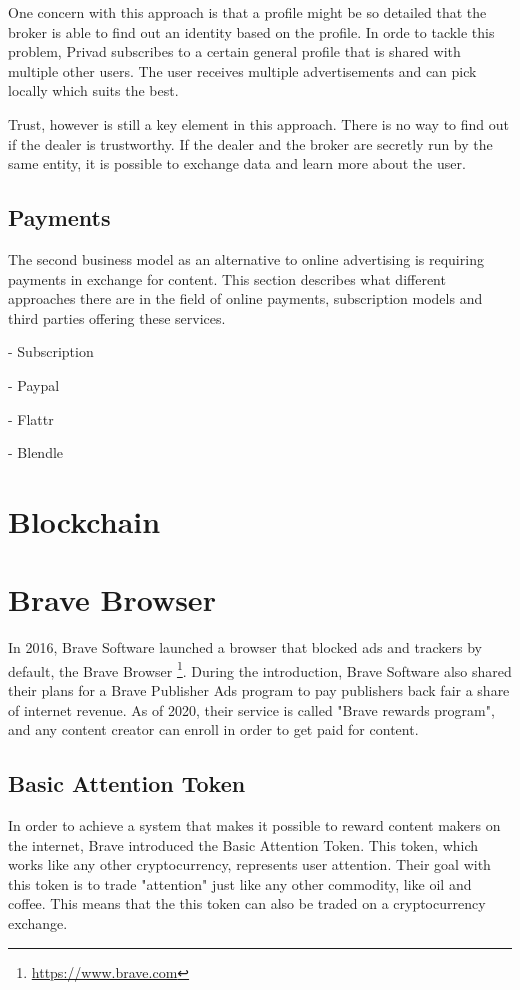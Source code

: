 One concern with this approach is that a profile might be so detailed that the broker is able to find out an identity based on the profile. In orde to tackle this problem, Privad subscribes to a certain general profile that is shared with multiple other users. The user receives multiple advertisements and can pick locally which suits the best.

Trust, however is still a key element in this approach. There is no way to find out if the dealer is trustworthy. If the dealer and the broker are secretly run by the same entity, it is possible to exchange data and learn more about the user. 

\subsection{Payments}

The second business model as an alternative to online advertising is requiring payments in exchange for content. This section describes what different approaches there are in the field of online payments, subscription models and third parties offering these services.


- Subscription

- Paypal

- Flattr

- Blendle






\section{Blockchain}

\section{Brave Browser}
In 2016, Brave Software launched a browser that blocked ads and trackers by default, the Brave Browser \footnote{\url{https://www.brave.com}}. During the introduction, Brave Software also shared their plans for a Brave Publisher Ads program to pay publishers back fair a share of internet revenue. As of 2020, their service is called "Brave rewards program", and any content creator can enroll in order to get paid for content. 

\subsection{Basic Attention Token} 
In order to achieve a system that makes it possible to reward content makers on the internet, Brave introduced the Basic Attention Token. This token, which works like any other cryptocurrency, represents user attention. Their goal with this token is to trade "attention" just like any other commodity, like oil and coffee. This means that the this token can also be traded on a cryptocurrency exchange. 

